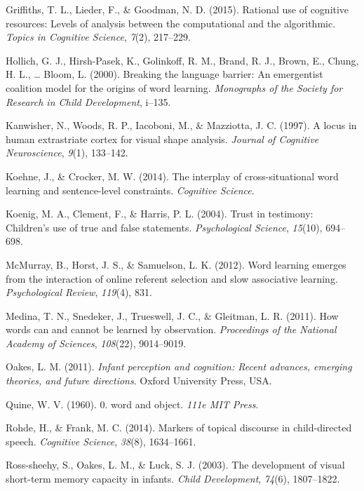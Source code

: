 \documentclass[authoryear, review]{elsarticle}
\begin{document}
\hypertarget{ref-griffiths2015rational}{}
Griffiths, T. L., Lieder, F., \& Goodman, N. D. (2015). Rational use of
cognitive resources: Levels of analysis between the computational and
the algorithmic. \emph{Topics in Cognitive Science}, \emph{7}(2),
217--229.

\hypertarget{ref-hollich2000breaking}{}
Hollich, G. J., Hirsh-Pasek, K., Golinkoff, R. M., Brand, R. J., Brown,
E., Chung, H. L., \ldots{} Bloom, L. (2000). Breaking the language
barrier: An emergentist coalition model for the origins of word
learning. \emph{Monographs of the Society for Research in Child
Development}, i--135.

\hypertarget{ref-kanwisher1997locus}{}
Kanwisher, N., Woods, R. P., Iacoboni, M., \& Mazziotta, J. C. (1997). A
locus in human extrastriate cortex for visual shape analysis.
\emph{Journal of Cognitive Neuroscience}, \emph{9}(1), 133--142.

\hypertarget{ref-koehne2014interplay}{}
Koehne, J., \& Crocker, M. W. (2014). The interplay of cross-situational
word learning and sentence-level constraints. \emph{Cognitive Science}.

\hypertarget{ref-koenig2004trust}{}
Koenig, M. A., Clement, F., \& Harris, P. L. (2004). Trust in testimony:
Children's use of true and false statements. \emph{Psychological
Science}, \emph{15}(10), 694--698.

\hypertarget{ref-mcmurray2012word}{}
McMurray, B., Horst, J. S., \& Samuelson, L. K. (2012). Word learning
emerges from the interaction of online referent selection and slow
associative learning. \emph{Psychological Review}, \emph{119}(4), 831.

\hypertarget{ref-medina2011words}{}
Medina, T. N., Snedeker, J., Trueswell, J. C., \& Gleitman, L. R.
(2011). How words can and cannot be learned by observation.
\emph{Proceedings of the National Academy of Sciences}, \emph{108}(22),
9014--9019.

\hypertarget{ref-oakes2011infant}{}
Oakes, L. M. (2011). \emph{Infant perception and cognition: Recent
advances, emerging theories, and future directions}. Oxford University
Press, USA.

\hypertarget{ref-quine19600}{}
Quine, W. V. (1960). 0. word and object. \emph{111e MIT Press}.

\hypertarget{ref-rohde2014markers}{}
Rohde, H., \& Frank, M. C. (2014). Markers of topical discourse in
child-directed speech. \emph{Cognitive Science}, \emph{38}(8),
1634--1661.

\hypertarget{ref-ross2003development}{}
Ross-sheehy, S., Oakes, L. M., \& Luck, S. J. (2003). The development of
visual short-term memory capacity in infants. \emph{Child Development},
\emph{74}(6), 1807--1822.
\end{document}
